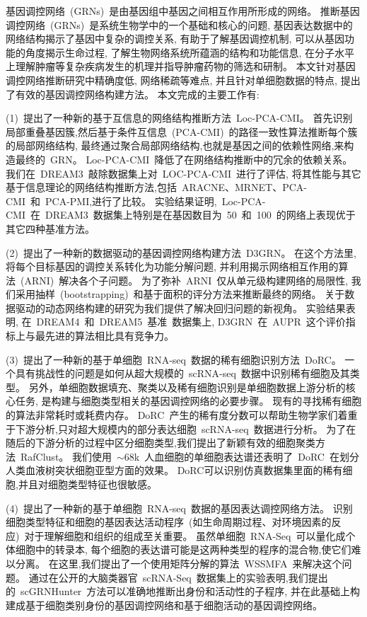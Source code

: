 \begin{abstractcn}
基因调控网络~(GRNs)~是由基因组中基因之间相互作用所形成的网络。
推断基因调控网络~(GRNs)~是系统生物学中的一个基础和核心的问题,
基因表达数据中的网络结构揭示了基因中复杂的调控关系, 有助于了解基因调控机制,
可以从基因功能的角度揭示生命过程, 了解生物网络系统所蕴涵的结构和功能信息,
在分子水平上理解肿瘤等复杂疾病发生的机理并指导肿瘤药物的筛选和研制。
本文针对基因调控网络推断研究中精确度低, 网络稀疏等难点,
并且针对单细胞数据的特点, 提出了有效的基因调控网络构建方法。
本文完成的主要工作有:

(1)~提出了一种新的基于互信息的网络结构推断方法~Loc-PCA-CMI。
首先识别局部重叠基因簇,然后基于条件互信息~(PCA-CMI)~的路径一致性算法推断每个簇的局部网络结构,
最终通过聚合局部网络结构,也就是基因之间的依赖性网络,来构造最终的~GRN。
Loc-PCA-CMI~降低了在网络结构推断中的冗余的依赖关系。
我们在~DREAM3~敲除数据集上对~LOC-PCA-CMI~进行了评估,
将其性能与其它基于信息理论的网络结构推断方法,包括~ARACNE、MRNET、PCA-CMI~和~PCA-PMI,进行了比较。
实验结果证明,~Loc-PCA-CMI~在~DREAM3~数据集上特别是在基因数目为~50~和~100~的网络上表现优于其它四种基准方法。

(2)~提出了一种新的数据驱动的基因调控网络构建方法~D3GRN。
在这个方法里,将每个目标基因的调控关系转化为功能分解问题,
并利用揭示网络相互作用的算法~(ARNI)~解决各个子问题。
为了弥补~ARNI~仅从单元级构建网络的局限性,
我们采用抽样~(bootstrapping)~和基于面积的评分方法来推断最终的网络。
关于数据驱动的动态网络构建的研究为我们提供了解决回归问题的新视角。
实验结果表明, 在~DREAM4~和~DREAM5~基准~数据集上, D3GRN~在~AUPR~这个评价指标上与最先进的算法相比具有竞争力。

(3)~提出了一种新的基于单细胞~RNA-seq~数据的稀有细胞识别方法~DoRC。
一个具有挑战性的问题是如何从超大规模的~scRNA-seq~数据中识别稀有细胞及其类型。
另外，单细胞数据填充、聚类以及稀有细胞识别是单细胞数据上游分析的核心任务, 
是构建与细胞类型相关的基因调控网络的必要步骤。
现有的寻找稀有细胞的算法非常耗时或耗费内存。
DoRC~产生的稀有度分数可以帮助生物学家们着重于下游分析,只对超大规模内的部分表达细胞~scRNA-seq~数据进行分析。
为了在随后的下游分析的过程中区分细胞类型,我们提出了新颖有效的细胞聚类方法~RafClust。
我们使用~${\sim}68$k~人血细胞的单细胞表达谱还表明了~DoRC~在划分人类血液树突状细胞亚型方面的效果。
DoRC可以识别仿真数据集里面的稀有细胞,并且对细胞类型特征也很敏感。

(4)~提出了一种新的基于单细胞~RNA-seq~数据的基因表达调控网络方法。
识别细胞类型特征和细胞的基因表达活动程序~(如生命周期过程、对环境因素的反应)~对于理解细胞和组织的组成至关重要。
虽然单细胞~RNA-Seq~可以量化成个体细胞中的转录本,
每个细胞的表达谱可能是这两种类型的程序的混合物,使它们难以分离。
在这里,我们提出了一个使用矩阵分解的算法~WSSMFA~来解决这个问题。
通过在公开的大脑类器官~scRNA-Seq~数据集上的实验表明,我们提出的~scGRNHunter~方法可以准确地推断出身份和活动性的子程序, 
并在此基础上构建成基于细胞类别身份的基因调控网络和基于细胞活动的基因调控网络。


\end{abstractcn}